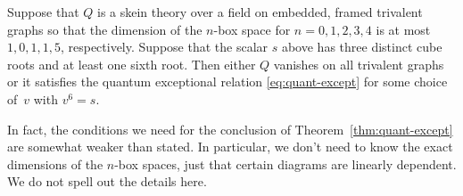 \documentclass[12pt]{amsart}
\begin{document}
\begin{theorem}\label{thm:quant-except}
  Suppose that $Q$ is a skein theory over a field on embedded, framed
  trivalent
  graphs so that the dimension of the $n$-box space for $n=0,1,2,3,4$
  is at most $1,0,1,1,5$, respectively. Suppose that the scalar $s$
  above has three distinct cube roots and at least one sixth root.
  Then either $Q$ vanishes on all trivalent
  graphs or it satisfies the quantum exceptional relation
  \eqref{eq:quant-except} for some choice of~$v$ with $v^6 = s$.
\end{theorem}

In fact, the conditions we need for the conclusion of
Theorem~\ref{thm:quant-except} are somewhat weaker than stated. In
particular, we
don't need to know the exact dimensions of the $n$-box spaces, just
that certain diagrams
are linearly dependent. We do not spell out the details here.
\end{document}
